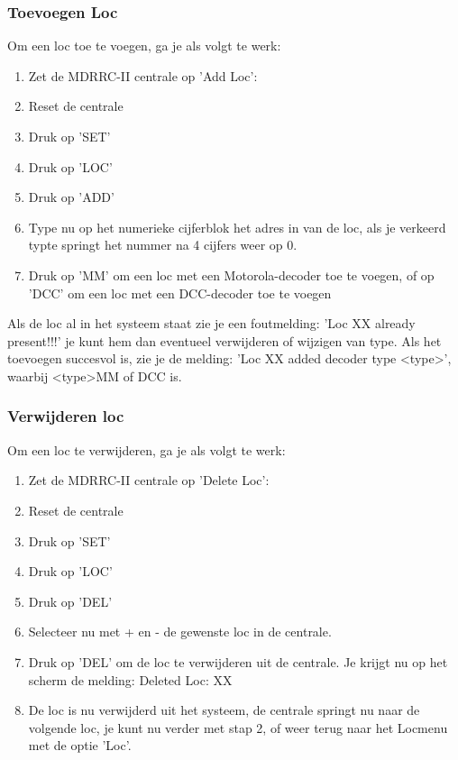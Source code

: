 \documentclass[12pt,a4paper]{report}
\begin{document}
\subsubsection{Toevoegen Loc}
Om een loc toe te voegen, ga je als volgt te werk:

\begin{enumerate}
\item Zet de MDRRC-II centrale op 'Add Loc': 
\item Reset de centrale
\item Druk op 'SET'
\item Druk op 'LOC'
\item Druk op 'ADD'
\item Type nu op het numerieke cijferblok het adres in van de loc, als je verkeerd typte springt het nummer na 4 cijfers weer op 0.
\item Druk op 'MM' om een loc met een Motorola-decoder toe te voegen, of op 'DCC' om een loc met een DCC-decoder toe te voegen
\end{enumerate}

Als de loc al in het systeem staat zie je een foutmelding:
 'Loc XX already present!!!'
je kunt hem dan eventueel verwijderen of wijzigen van type. Als het toevoegen succesvol is, zie je de melding: 'Loc XX added decoder type \textless type\textgreater ', 
waarbij \textless type\textgreater  MM of DCC is.
\subsubsection{Verwijderen loc}
Om een loc te verwijderen, ga je als volgt te werk:
\begin{enumerate}
\item Zet de MDRRC-II centrale op 'Delete Loc': 
\item Reset de centrale
\item Druk op 'SET'
\item Druk op 'LOC'
\item Druk op 'DEL'
\item Selecteer nu met + en - de gewenste loc in de centrale.
\item Druk op 'DEL' om de loc te verwijderen uit de centrale. Je krijgt nu op het scherm de melding:
Deleted Loc: XX
\item De loc is nu verwijderd uit het systeem, de centrale springt nu naar de volgende loc, je kunt nu verder met stap 2, of weer terug naar het Locmenu met de optie 'Loc'.
\end{enumerate}
\end{document}
